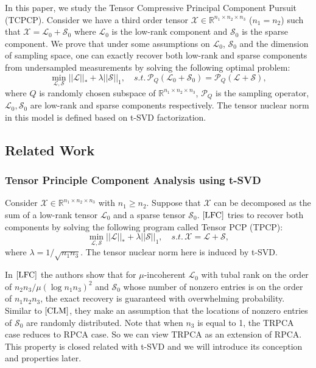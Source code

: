 \documentclass[journal,transmag]{IEEEtran}
\theoremstyle{plain}
\begin{document}
In this paper, we study the Tensor Compressive Principal Component Pursuit (TCPCP). Consider we have a third order tensor $\mathcal{X}\in \mathbb{R}^{n_1\times n_2 \times n_3}$ ($n_1=n_2$) such that $\mathcal{X}=\mathcal{L}_0+\mathcal{S}_0$ where $\mathcal{L}_0$ is the low-rank component and $\mathcal{S}_0$ is the sparse component. We prove that under some assumptions on $\mathcal{L}_0$, $\mathcal{S}_0$ and the dimension of sampling space, one can exactly recover both low-rank and sparse components from undersampled measurements by solving the following optimal problem:
\begin{equation} \label{TCPCP}
\min_{\mathcal{L},\mathcal{\mathcal{S}}} ||\mathcal{L}||_*+\lambda ||\mathcal{S}||_1, \quad s.t. \,\mathcal{P}_Q(\mathcal{L}_0+\mathcal{S}_0)=\mathcal{P}_Q(\mathcal{L}+\mathcal{S}),
\end{equation}
where $Q$ is randomly chosen subspace of $\mathbb{R}^{n_1\times n_2 \times n_3}$, $\mathcal{P}_Q$ is the sampling operator, $\mathcal{L}_0,\mathcal{S}_0$ are low-rank and sparse components respectively. The tensor nuclear norm in this model is defined based on t-SVD factorization.

\subsection{Related Work}

\subsubsection{Tensor Principle Component Analysis using t-SVD}
Consider $\mathcal{X}\in \mathbb{R}^{n_1\times n_2 \times n_3}$ with $n_1 \ge n_2$. Suppose that $\mathcal{X}$ can be decomposed as the sum of a low-rank tensor $\mathcal{L}_0$ and a sparse tensor $\mathcal{S}_0$. $\cite{LFC}$ tries to recover both components by solving the following program called Tensor PCP (TPCP):
\begin{equation}
\min_{\mathcal{L},\mathcal{\mathcal{S}}} ||\mathcal{L}||_*+\lambda ||\mathcal{S}||_1, \quad s.t. \,\mathcal{X}=\mathcal{L}+\mathcal{S},
\end{equation}
 where $\lambda=1/\sqrt{n_1 n_3}$. The tensor nuclear norm here is induced by t-SVD.

In $\cite{LFC}$ the authors show that for $\mu$-incoherent $\mathcal{L}_0$ with tubal rank on the order of $n_2 n_3/\mu(\log n_1 n_3)^2$ and $\mathcal{S}_0$ whose number of nonzero entries is on the order of $n_1 n_2 n_3$, the exact recovery is guaranteed with overwhelming probability. Similar to $\cite{CLM}$, they make an assumption that the locations of nonzero entries of $\mathcal{S}_0$ are randomly distributed. Note that when $n_3$ is equal to 1, the TRPCA case reduces to RPCA case. So we can view TRPCA as an extension of RPCA. This property is closed related with t-SVD and we will introduce its conception and properties later.
\\
\end{document}
